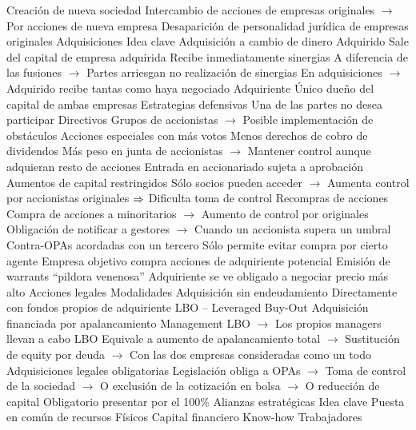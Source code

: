 \documentclass{nuevotema}
\begin{document}
\begin{esquemal}
				\4 Creación de nueva sociedad
				\4[] Intercambio de acciones de empresas originales
				\4[] $\to$ Por acciones de nueva empresa
				\4[] Desaparición de personalidad jurídica de empresas originales
		\2 Adquisiciones
			\3 Idea clave
				\4 Adquisición a cambio de dinero
				\4 Adquirido
				\4[] Sale del capital de empresa adquirida
				\4[] Recibe inmediatamente sinergias
				\4[] A diferencia de las fusiones
				\4[] $\to$ Partes arriesgan no realización de sinergias
				\4[] En adquisiciones
				\4[] $\to$ Adquirido recibe tantas como haya negociado
				\4 Adquiriente
				\4[] Único dueño del capital de ambas empresas
			\3 Estrategias defensivas
				\4 Una de las partes no desea participar
				\4[] Directivos
				\4[] Grupos de accionistas
				\4[] $\to$ Posible implementación de obstáculos
				\4 Acciones especiales con más votos
				\4[] Menos derechos de cobro de dividendos
				\4[] Más peso en junta de accionistas
				\4[] $\to$ Mantener control aunque adquieran resto de acciones
				\4 Entrada en accionariado sujeta a aprobación
				\4 Aumentos de capital restringidos
				\4[] Sólo socios pueden acceder
				\4[] $\to$ Aumenta control por accionistas originales
				\4[] $\Rightarrow$ Dificulta toma de control
				\4 Recompras de acciones
				\4[] Compra de acciones a minoritarios
				\4[] $\to$ Aumento de control por originales
				\4 Obligación de notificar a gestores
				\4[] $\to$ Cuando un accionista supera un umbral
				\4 Contra-OPAs acordadas con un tercero
				\4[] Sólo permite evitar compra por cierto agente
				\4 Empresa objetivo compra acciones de adquiriente potencial
				\4 Emisión de warrants ``pildora venenosa''
				\4[] Adquiriente se ve obligado a negociar precio más alto
				\4 Acciones legales
			\3 Modalidades
				\4 Adquisición sin endeudamiento
				\4[] Directamente con fondos propios de adquiriente
				\4 LBO -- Leveraged Buy-Out
				\4[] Adquisición financiada por apalancamiento
				\4[] Management LBO
				\4[] $\to$ Los propios managers llevan a cabo LBO
				\4[] Equivale a aumento de apalancamiento total
				\4[] $\to$ Sustitución de equity por deuda
				\4[] $\to$ Con las dos empresas consideradas como un todo
				\4 Adquisiciones legales obligatorias
				\4[] Legislación obliga a OPAs
				\4[] $\to$ Toma de control de la sociedad
				\4[] $\to$ O exclusión de la cotización en bolsa
				\4[] $\to$ O reducción de capital
				\4[] Obligatorio presentar por el 100\%
		\2 Alianzas estratégicas
			\3 Idea clave
				\4 Puesta en común de recursos
				\4[] Físicos
				\4[] Capital financiero
				\4[] Know-how
				\4[] Trabajadores

\end{esquemal}
\end{document}
